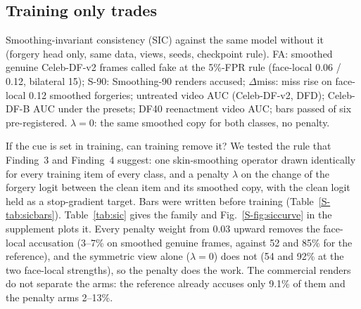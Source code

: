 \documentclass[conference]{IEEEtran}
\begin{document}
\subsection{Training only trades}
\label{sec:sic}
\begin{table}[t]
\centering
\caption{Smoothing-invariant consistency (SIC) against the same model without it (forgery head only, same data, views, seeds, checkpoint rule). FA: smoothed genuine Celeb-DF-v2 frames called fake at the 5\%-FPR rule (face-local 0.06 / 0.12, bilateral 15); S-90: Smoothing-90 renders accused; $\Delta$miss: miss rise on face-local 0.12 smoothed forgeries; untreated video AUC (Celeb-DF-v2, DFD); Celeb-DF-B AUC under the presets; DF40 reenactment video AUC; bars passed of six pre-registered. $\lambda=0$: the same smoothed copy for both classes, no penalty.}
\label{tab:sic}
\footnotesize
\begin{adjustbox}{max width=\textwidth}\end{adjustbox}
\end{table}

If the cue is set in training, can training remove it? We tested the rule that Finding~3 and Finding~4 suggest: one
skin-smoothing operator drawn identically for every training item of every class, and a penalty $\lambda$ on the change of
the forgery logit between the clean item and its smoothed copy, with the clean logit held as a stop-gradient target. Bars
were written before training (Table~\ref{S-tab:sicbars}). Table~\ref{tab:sic} gives the family and Fig.~\ref{S-fig:siccurve} in the supplement plots it. Every penalty
weight from 0.03 upward removes the face-local accusation (3--7\% on smoothed genuine frames, against 52 and 85\% for the
reference), and the symmetric view alone ($\lambda=0$) does not (54 and 92\% at the two face-local strengths), so the
penalty does the work. The commercial renders do not separate the arms: the reference already accuses only 9.1\% of them
and the penalty arms 2--13\%.

\end{document}
